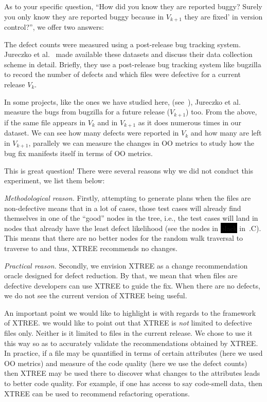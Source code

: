 As to your specific question, ``How did you know they are reported buggy? Surely you only know they are reported buggy because in $V_{k+1}$ they are fixed' in version control?'', we offer two answers:
\be
\item[a. ] The defect counts were measured using a post-release bug tracking system. Jureczko et al.~\citep{Jureczko2010} made available these datasets and discuss their data collection scheme in detail. Briefly, they use a post-release bug tracking system like bugzilla to record the number of defects and which files were defective for a current release $V_k$.  
\item[b. ] In some projects, like the ones we have studied here, (see~), Jureczko et al.~\citep{Jureczko2010} measure the bugs from bugzilla for a future release ($V_{k+1}$) too.
\ee
From the above, if the same file appears in $V_k$ and in $V_{k+1}$ as it does numerous times in our dataset. We can see how many defects were reported in $V_k$ and how many are left in $V_{k+1}$, parallely we can measure the changes in OO metrics to study how the bug fix manifests itself in terms of OO metrics. 


This is great question! There were several reasons why we did not conduct this experiment, we list them below:
\be
\item \textit{Methodological reason.} Firstly, attempting to generate plans when the files are non-defective means that in a lot of cases, those test cases will already find themselves in one of the ``good'' nodes in the tree, i.e., the test cases will land in nodes that already have the least defect likelihood (see the nodes in \colorbox{black}{{\color{white} black}} in~.C). This means that there are no better nodes for the random walk traversal to traverse to and thus, XTREE recommends no changes.   
\item \textit{Practical reason.} Secondly, we envision XTREE as a change recommendation oracle designed for defect reduction. By that, we mean that when files are defective developers can use XTREE to guide the fix. When there are no defects, we do not see the current version of XTREE being useful.   
\ee

An important point we would like to highlight is with regards to the framework of XTREE. we would like to point out that XTREE is \textit{not} limited to defective files only. Neither is it limited to files in the current release. We chose to use it this way so as to accurately validate the recommendations obtained by XTREE. In practice, if a file may be quantified in terms of certain attributes (here we used OO metrics) and measure of the code quality (here we use the defect counts) then XTREE may be used there to discover what changes to the attributes leads to better code quality. For example, if one has access to say code-smell data, then XTREE can be used to recommend refactoring operations.


